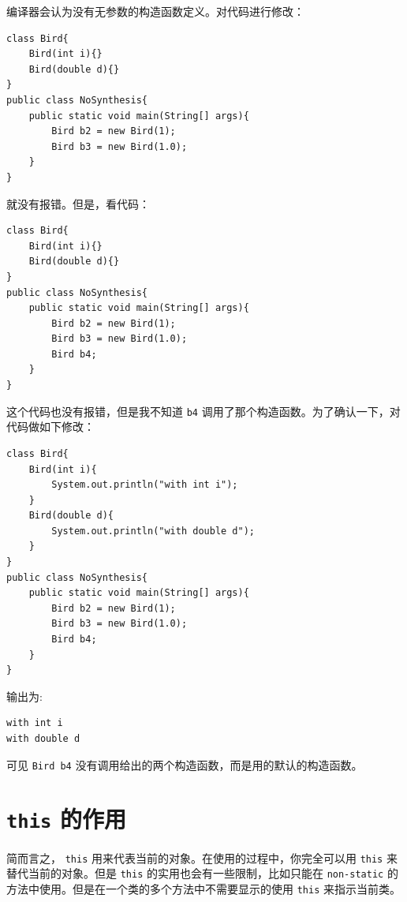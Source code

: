 \documentclass[10pt,a4paper,UTF8]{article}
\begin{document}
编译器会认为没有无参数的构造函数定义。对代码进行修改：
\lstset{language=java,label= ,caption= ,captionpos=b,firstnumber=1,numbers=left}
\begin{lstlisting}
class Bird{
    Bird(int i){}
    Bird(double d){}
}
public class NoSynthesis{
    public static void main(String[] args){
        Bird b2 = new Bird(1);
        Bird b3 = new Bird(1.0);
    }
}
\end{lstlisting}
就没有报错。但是，看代码：
\lstset{language=java,label= ,caption= ,captionpos=b,firstnumber=1,numbers=left}
\begin{lstlisting}
class Bird{
    Bird(int i){}
    Bird(double d){}
}
public class NoSynthesis{
    public static void main(String[] args){
        Bird b2 = new Bird(1);
        Bird b3 = new Bird(1.0);
        Bird b4;
    }
}
\end{lstlisting}
这个代码也没有报错，但是我不知道 \texttt{b4} 调用了那个构造函数。为了确认一下，对代码做如下修改：
\lstset{language=java,label= ,caption= ,captionpos=b,firstnumber=1,numbers=left}
\begin{lstlisting}
class Bird{
    Bird(int i){
        System.out.println("with int i");
    }
    Bird(double d){
        System.out.println("with double d");
    }
}
public class NoSynthesis{
    public static void main(String[] args){
        Bird b2 = new Bird(1);
        Bird b3 = new Bird(1.0);
        Bird b4;
    }
}
\end{lstlisting}

输出为:
\begin{verbatim}
with int i
with double d
\end{verbatim}
可见 \texttt{Bird b4} 没有调用给出的两个构造函数，而是用的默认的构造函数。
\section{\texttt{this} 的作用}
\label{sec:orgf2d989d}


简而言之， \texttt{this} 用来代表当前的对象。在使用的过程中，你完全可以用 \texttt{this} 来替代当前的对象。但是 \texttt{this} 的实用也会有一些限制，比如只能在 \texttt{non-static} 的方法中使用。但是在一个类的多个方法中不需要显示的使用 \texttt{this} 来指示当前类。
\end{document}
